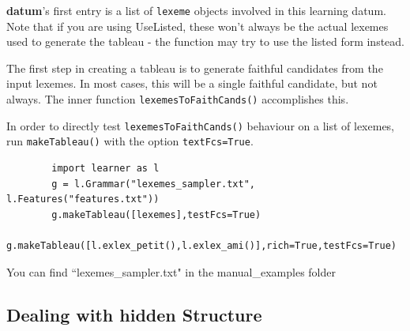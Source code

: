 \documentclass[12]{article}
\begin{document}
	{\bf datum}'s first entry is a list of \texttt{lexeme} objects involved in this learning datum.  Note that if you are using UseListed, these won't always be the actual lexemes used to generate the tableau - the function may try to use the listed form instead.
	
	The first step in creating a tableau is to generate faithful candidates from the input lexemes.  In most cases, this will be a single faithful candidate, but not always.  The inner function \texttt{lexemesToFaithCands()} accomplishes this.
	
	In order to directly test \texttt{lexemesToFaithCands()} behaviour on a list of lexemes, run \texttt{makeTableau()} with the option \texttt{textFcs=True}.
	
	\begin{verbatim}
		import learner as l
		g = l.Grammar("lexemes_sampler.txt", l.Features("features.txt"))
		g.makeTableau([lexemes],testFcs=True)
		g.makeTableau([l.exlex_petit(),l.exlex_ami()],rich=True,testFcs=True)
	\end{verbatim}
	
	You can find ``lexemes\_sampler.txt" in the manual\_examples folder
	
	
	
	
	
	
	
	
	
	
	\subsection{Dealing with hidden Structure}
	
\end{document}
